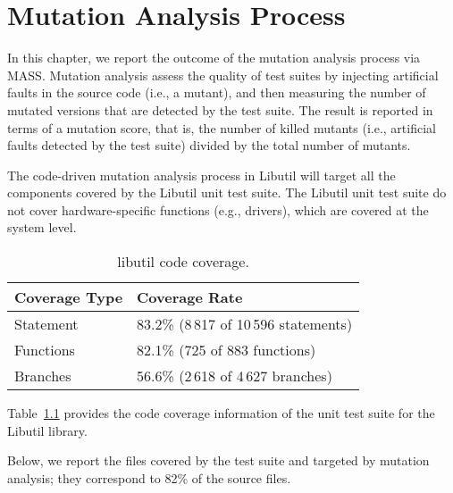 
\chapter{Mutation Analysis Process}
\label{mass_output}

In this chapter, we report the outcome of the mutation analysis process via MASS. Mutation analysis assess the quality of test suites by injecting artificial faults in the source code (i.e., a mutant), and then measuring the number of mutated versions that are detected by the test suite. The result is reported in terms of a mutation score, that is, the number of killed mutants (i.e., artificial faults detected by the test suite) divided by the total number of mutants.

The code-driven mutation analysis process in Libutil will target all the components covered by the Libutil unit test suite. 
The Libutil unit test suite do not cover hardware-specific functions (e.g., drivers), which are covered at the system level.

\begin{table}[h]
\centering
\begin{tabular}{|l|l|}
\hline
\textbf{Coverage Type} & \textbf{Coverage Rate} \\
\hline
Statement     & 83.2\% (8\,817 of 10\,596 statements)\\
Functions     & 82.1\% (725 of 883 functions)\\
Branches      & 56.6\% (2\,618 of 4\,627 branches)\\
\hline
\end{tabular}
\caption{libutil code coverage.}
\label{table:gslibutil_coverage}
\end{table}

Table~\ref{table:gslibutil_coverage} provides the code coverage information of the unit test suite for the Libutil library. 

Below, we report the files covered by the test suite and targeted by mutation analysis; they correspond to 82\% of the source files. 

